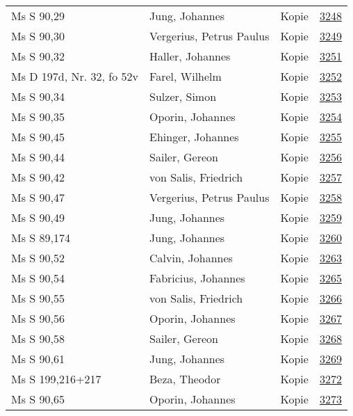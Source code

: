 \documentclass[10pt,a4paper,landscape]{report}
\begin{document}
\begin{longtable}{p{16cm}p{4cm}lr}
Ms S 90,29	&	Jung, Johannes	&	Kopie	&	\href{http://130.60.24.72/assignment/3248}{3248}\\
Ms S 90,30	&	Vergerius, Petrus Paulus	&	Kopie	&	\href{http://130.60.24.72/assignment/3249}{3249}\\
Ms S 90,32	&	Haller, Johannes	&	Kopie	&	\href{http://130.60.24.72/assignment/3251}{3251}\\
Ms D 197d, Nr. 32, fo 52v	&	Farel, Wilhelm	&	Kopie	&	\href{http://130.60.24.72/assignment/3252}{3252}\\
Ms S 90,34	&	Sulzer, Simon	&	Kopie	&	\href{http://130.60.24.72/assignment/3253}{3253}\\
Ms S 90,35	&	Oporin, Johannes	&	Kopie	&	\href{http://130.60.24.72/assignment/3254}{3254}\\
Ms S 90,45	&	Ehinger, Johannes	&	Kopie	&	\href{http://130.60.24.72/assignment/3255}{3255}\\
Ms S 90,44	&	Sailer, Gereon	&	Kopie	&	\href{http://130.60.24.72/assignment/3256}{3256}\\
Ms S 90,42	&	von Salis, Friedrich	&	Kopie	&	\href{http://130.60.24.72/assignment/3257}{3257}\\
Ms S 90,47	&	Vergerius, Petrus Paulus	&	Kopie	&	\href{http://130.60.24.72/assignment/3258}{3258}\\
Ms S 90,49	&	Jung, Johannes	&	Kopie	&	\href{http://130.60.24.72/assignment/3259}{3259}\\
Ms S 89,174	&	Jung, Johannes	&	Kopie	&	\href{http://130.60.24.72/assignment/3260}{3260}\\
Ms S 90,52	&	Calvin, Johannes	&	Kopie	&	\href{http://130.60.24.72/assignment/3263}{3263}\\
Ms S 90,54	&	Fabricius, Johannes	&	Kopie	&	\href{http://130.60.24.72/assignment/3265}{3265}\\
Ms S 90,55	&	von Salis, Friedrich	&	Kopie	&	\href{http://130.60.24.72/assignment/3266}{3266}\\
Ms S 90,56	&	Oporin, Johannes	&	Kopie	&	\href{http://130.60.24.72/assignment/3267}{3267}\\
Ms S 90,58	&	Sailer, Gereon	&	Kopie	&	\href{http://130.60.24.72/assignment/3268}{3268}\\
Ms S 90,61	&	Jung, Johannes	&	Kopie	&	\href{http://130.60.24.72/assignment/3269}{3269}\\
Ms S 199,216+217	&	Beza, Theodor	&	Kopie	&	\href{http://130.60.24.72/assignment/3272}{3272}\\
Ms S 90,65	&	Oporin, Johannes	&	Kopie	&	\href{http://130.60.24.72/assignment/3273}{3273}\\

\end{longtable}
\end{document}
